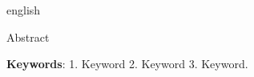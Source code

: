 \setlength{\absparsep}{18pt} %
\begin{resumo}
	
	\begin{otherlanguage*}{english}
		
		Abstract
		
		\vspace{\onelineskip}
		 
		\textbf{Keywords}: 1. Keyword 2. Keyword 3. Keyword.
		
	\end{otherlanguage*}

\end{resumo} 